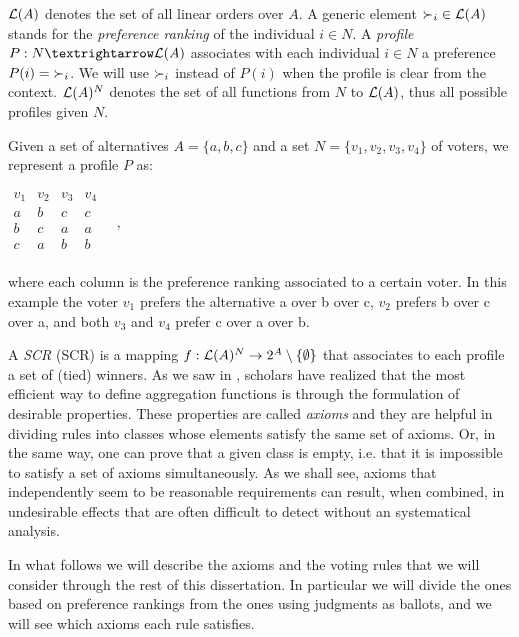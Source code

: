 $\mathcal{L}(A)$ denotes the set of all linear orders over $A$. A generic element $\mathop{\prefi} \in \linors$ stands for the \textit{preference ranking} of the individual $i\in N$.
A \emph{profile} $\prof: N → \linors$ associates with each individual $i \in N$ a preference $\prof(i) =\mathop{\prefi}$. We will use $\mathop{\prefi}$ instead of $P(i)$ when the profile is clear from the context. $\mathcal{L}(A)^{N}$ denotes the set of all functions from $N$ to $\mathcal{L}(A)$, thus all possible profiles given $N$. 
\begin{example}
	\label{ex:namedprofile}
	Given a set of alternatives $A=\{a,b,c\}$ and a set $N=\{v_1,v_2,v_3,v_4\}$ of voters, we represent a profile $P$ as:
	\begin{center}
		$
		\begin{array}{cccc}
			v_1 & v_2 & v_3 & v_4\\
			a &	b & c & c \\
			b &	c & a & a \\
			c &	a & b & b \\
		\end{array} \quad, 
		$
	\end{center}
	where each column is the preference ranking associated to a certain voter. In this example the voter $v_1$ prefers the alternative a over b over c, $v_2$ prefers b over c over a, and both $v_3$ and $v_4$ prefer c over a over b.
\end{example}

A \emph{\acl{SCR}} (\acs{SCR}) is a mapping $f:\mathcal{L}(A)^{N}\rightarrow 2^{A} \setminus \{\emptyset \}$ that associates to each profile a set of (tied) winners. 
As we saw in , scholars have realized that the most efficient way to define aggregation functions is through the formulation of desirable properties.
These properties are called \textit{axioms} and they are helpful in dividing rules into classes whose elements satisfy the same set of axioms.
Or, in the same way, one can prove that a given class is empty, i.e. that it is impossible to satisfy a set of axioms simultaneously.
As we shall see, axioms that independently seem to be reasonable requirements can result, when combined, in undesirable effects that are often difficult to detect without an systematical analysis.

In what follows we will describe the axioms and the voting rules that we will consider through the rest of this dissertation. In particular we will divide the ones based on preference rankings from the ones using judgments as ballots, and we will see which axioms each rule satisfies.

